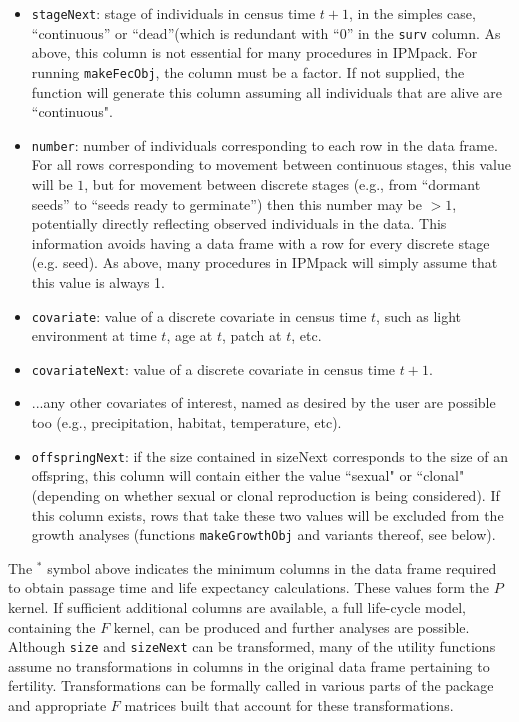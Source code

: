 \documentclass{article}
\begin{document}
\begin{itemize}
\item  {\tt stageNext}: stage of individuals in census time $t+1$, in the
simples case, ``continuous'' or ``dead''(which is redundant with ``0''
in the {\tt surv} column. As above, this column is not essential
for many procedures in  IPMpack. For running {\tt makeFecObj}, the column must be a factor. If not supplied, the function will generate this column assuming all individuals that are alive are ``continuous".
\item  {\tt number}: number of individuals corresponding to each row in the data frame. For all rows corresponding to movement between continuous stages, this value will be $1$, but for movement between  discrete stages (e.g., from ``dormant seeds'' to ``seeds ready to  germinate'') then this number may be $>1$, potentially directly  reflecting observed individuals in the data. This information avoids having a data frame with a row for every discrete stage (e.g. seed). As above, many  procedures in IPMpack will simply assume that this value is always 1. 
\item  {\tt covariate}: value of a discrete covariate in census time  $t$, such as light environment at time $t$, age at $t$, patch at $t$, etc. 
\item  {\tt covariateNext}: value of a discrete covariate in census time $t+1$.
\item  ...any other covariates of interest, named as desired by the user are possible too (e.g., precipitation, habitat, temperature, etc).
\item {\tt offspringNext}: if the size contained in sizeNext corresponds to the
size of an offspring, this column will contain either the value ``sexual" or
``clonal" (depending on whether sexual or clonal reproduction is being
considered). If this column exists, rows that take these two values will be excluded from the growth analyses (functions {\tt makeGrowthObj} and variants thereof, see below).
\end{itemize}

The $^*$ symbol above indicates the minimum columns in the data frame required to obtain passage time and life expectancy calculations. These values form the $P$ kernel. If sufficient additional columns are available, a full life-cycle model, containing the $F$ kernel, can be produced and further analyses are possible.  Although {\tt size} and {\tt sizeNext} can be transformed, many of the utility functions assume no transformations in columns in the original data frame pertaining to fertility. Transformations can be formally called in various parts of the package and appropriate $F$ matrices built that account for these transformations. 
\end{document}

